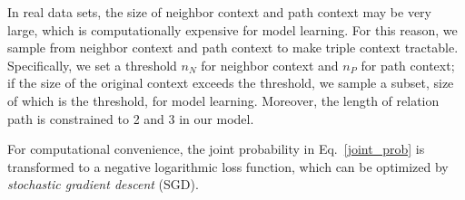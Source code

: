 In real data sets, the size of neighbor context and path context may be very large, which is computationally expensive for model learning. For this reason, we sample from neighbor context and path context to make triple context tractable. Specifically, we set a threshold $n_N$ for neighbor context and $n_P$ for path context; if the size of the original context exceeds the threshold, we sample a subset, size of which is the threshold, for model learning. Moreover, the length of relation path is constrained to 2 and 3 in our model.

For computational convenience, the joint probability in Eq.~\eqref{joint_prob} is transformed to a negative logarithmic loss function, which can be optimized by \emph{stochastic gradient descent} (SGD).

\begin{comment}
the objective function is formulated as follows:
\begin{equation}\label{cost_function}
  \mathcal{L}(\mathcal{K}) = \sum_{(h,r,t)\in\mathcal{K}}
\end{equation}

For computational convenience, the original joint probability in Eq.~\eqref{joint_prob} is transformed into the negative logarithmic form, which can be optimized by stochastic gradient descent (SGD). The cost function of a triple $(h,r,t)$ is formulated as:
\begin{equation}\label{score_function}
*
\end{equation}
\end{comment}




